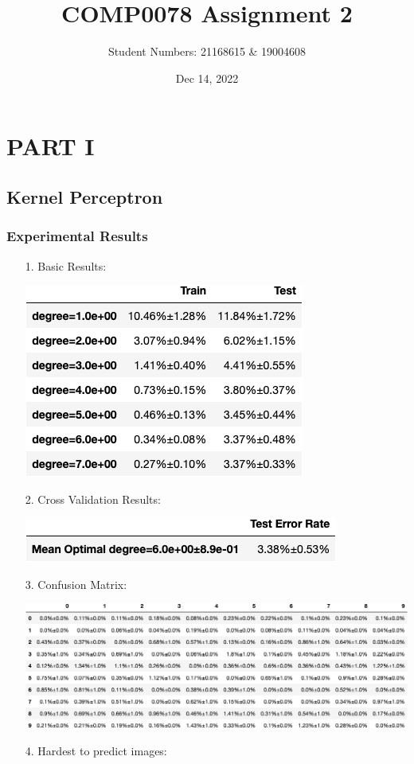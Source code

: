 \documentclass[12pt]{article}
\title{\textbf{COMP0078 Assignment 2}}
\author{Student Numbers: 21168615 \& 19004608 \\ }
\date{Dec 14, 2022}
\begin{document}
    \maketitle
\section{PART I}
\subsection{Kernel Perceptron}
\subsubsection{Experimental Results}

\begin{itemize}
    \item[1.] Basic Results:

    \includegraphics{outputs/part1/q1.png}


    \item[2.] Cross Validation Results:

    \includegraphics{outputs/part1/q2.png}

    \item[3.] Confusion Matrix:

    \includegraphics{outputs/part1/q3_confusion.png}
\newpage
    \item[4.] Hardest to predict images:


\end{itemize}
\end{document}
